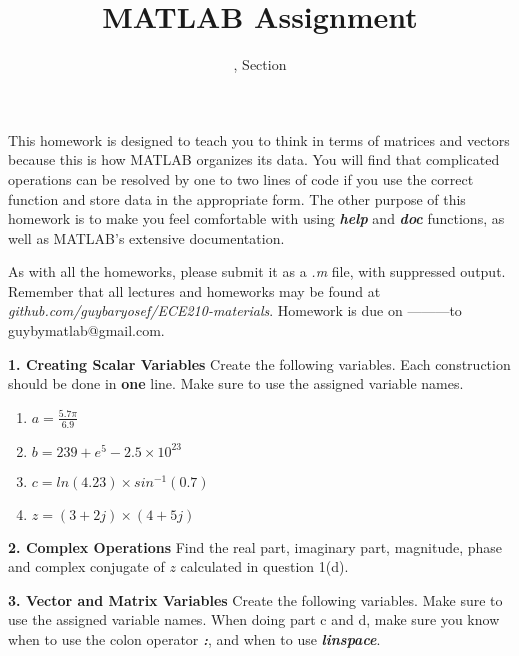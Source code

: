 \documentclass[11pt]{article}
\title{MATLAB Assignment \Homework}
\author{\Session, Section \Section}
\date{}
\makeatletter
\def\MyEmail{guybymatlab@gmail.com}
\def\DateOfSubmission{---------}
\newenvironment{qparts}{\begin{enumerate}[{(}a{)}]}{\end{enumerate}}
\makeatother
\begin{document}
\maketitle
This homework is designed to teach you to think in terms of matrices
and vectors because this is how MATLAB organizes its data. 
You will find that complicated operations can be resolved by one 
to two lines of code if you use the correct function and store data 
in the appropriate form. The other purpose of this homework is to make you feel comfortable
with using \textbf{\textit{help}} and \textbf{\textit{doc}} functions, 
as well as MATLAB's extensive documentation.

As with all the homeworks, please submit it as a \textit{.m} file, 
with suppressed output.
Remember that all lectures and homeworks may be found at 
\textit{github.com/guybaryosef/ECE210-materials}.
Homework is due on \DateOfSubmission to \MyEmail. 
\newline

\noindent \textbf{1. Creating Scalar Variables} 
Create the following variables. 
Each construction should be done in \textbf{one} line.
Make sure to use the assigned variable names. 
\begin{qparts}
\item
$ a = \frac{5.7 \pi}{6.9} $
\item 
$ b = 239+e^5 - 2.5 \times 10^{23}$
\item
$ c = ln(4.23) \times sin^{-1}(0.7)$
\item 
$ z = (3+2j) \times (4+5j) $

\end{qparts}

\noindent 
\newline
\textbf{2. Complex Operations} 
Find the real part, imaginary part, magnitude, 
phase and complex conjugate of $z$ calculated in question 1(d).

\noindent 
\newline
\textbf{3. Vector and Matrix Variables} 
Create the following variables. 
Make sure to use the assigned variable names. 
When doing part c and d, 
make sure you know when to use the colon operator \textbf{\textit{:}},
and when to use \textbf{\textit{linspace}}. 
\end{document}
